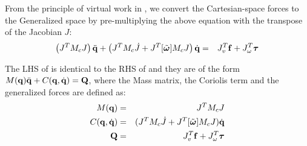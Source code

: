 From the principle of virtual work in , we convert the Cartesian-space forces to the Generalized space by pre-multiplying the above equation with the transpose of the Jacobian $J$:
\begin{eqnarray}
\label{eq:dyngen_vec2}
\left (J^T M_c J \right ) \ddot{\mathbf{q}} + \left (J^T M_c \dot{J} + J^T [\tilde{\bm{\omega}}]M_c J \right ) \dot{\mathbf{q}} & = & J_v^T \mathbf{f} + J_\omega^T \bm{\tau}
\end{eqnarray}

The LHS of  is identical to the RHS of  and they are of the form $M(\mathbf{q})\ddot{\mathbf{q}} + C(\mathbf{q},\dot{\mathbf{q}}) = \mathbf{Q}$, where the Mass matrix, the Coriolis term and the generalized forces are defined as:
\begin{eqnarray}
\label{eq:summary_dynamics}
\nonumber
M(\mathbf{q}) & = & J^T M_c J\\
\nonumber
C(\mathbf{q},\dot{\mathbf{q}}) & = & (J^T M_c \dot{J} + J^T [\tilde{\bm{\omega}}]M_c J)\dot{\mathbf{q}}\\
\mathbf{Q} & = & J_v^T \mathbf{f} + J_\omega^T \bm{\tau}
\end{eqnarray}

